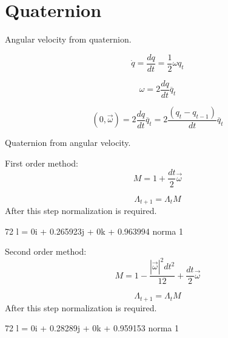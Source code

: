 \documentclass[12pt]{article}
\begin{document}
\section*{Quaternion}
\begin{flushleft}

Angular velocity from quaternion.

\[
\dot q = \frac{dq}{dt} = \frac{1}{2}\omega q_t
\]

\[
\omega = 2 \frac{dq}{dt} \overline q_t
\]

\[
(0,\vec\omega) = 2 \frac{dq}{dt} \overline q_t = 2 \frac{(q_t - q_{t-1})}{dt} \overline q_t
\]

Quaternion from angular velocity.

First order method:
\[
M = 1 + \frac{dt}{2}\vec\omega
\]

\[
\Lambda_{t+1} = \Lambda_tM
\]
After this step normalization is required.

72 l = 0i + 0.265923j + 0k + 0.963994 norma 1

Second order method:
\[
M = 1 - \frac{|\vec\omega|^2dt^2}{12} + \frac{dt}{2}\vec\omega
\]

\[
\Lambda_{t+1} = \Lambda_tM
\]
After this step normalization is required.

72 l = 0i + 0.28289j + 0k + 0.959153 norma 1


\end{flushleft}
\end{document}
